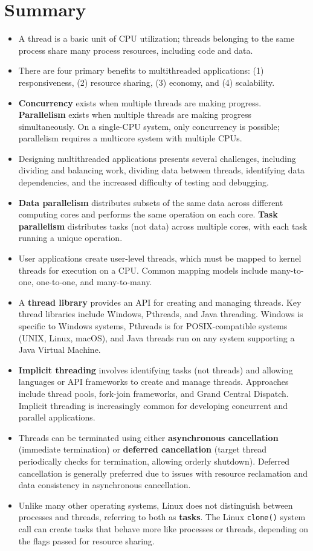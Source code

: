 \section{Summary}\label{sec:4.8}

\begin{itemize}
    \item A thread is a basic unit of CPU utilization; threads belonging to the same process share many process resources, including code and data.
    \item There are four primary benefits to multithreaded applications: (1) responsiveness, (2) resource sharing, (3) economy, and (4) scalability.
    \item \textbf{Concurrency} exists when multiple threads are making progress. \textbf{Parallelism} exists when multiple threads are making progress simultaneously. On a single-CPU system, only concurrency is possible; parallelism requires a multicore system with multiple CPUs.
    \item Designing multithreaded applications presents several challenges, including dividing and balancing work, dividing data between threads, identifying data dependencies, and the increased difficulty of testing and debugging.
    \item \textbf{Data parallelism} distributes subsets of the same data across different computing cores and performs the same operation on each core. \textbf{Task parallelism} distributes tasks (not data) across multiple cores, with each task running a unique operation.
    \item User applications create user-level threads, which must be mapped to kernel threads for execution on a CPU. Common mapping models include many-to-one, one-to-one, and many-to-many.
    \item A \textbf{thread library} provides an API for creating and managing threads. Key thread libraries include Windows, Pthreads, and Java threading. Windows is specific to Windows systems, Pthreads is for POSIX-compatible systems (UNIX, Linux, macOS), and Java threads run on any system supporting a Java Virtual Machine.
    \item \textbf{Implicit threading} involves identifying tasks (not threads) and allowing languages or API frameworks to create and manage threads. Approaches include thread pools, fork-join frameworks, and Grand Central Dispatch. Implicit threading is increasingly common for developing concurrent and parallel applications.
    \item Threads can be terminated using either \textbf{asynchronous cancellation} (immediate termination) or \textbf{deferred cancellation} (target thread periodically checks for termination, allowing orderly shutdown). Deferred cancellation is generally preferred due to issues with resource reclamation and data consistency in asynchronous cancellation.
    \item Unlike many other operating systems, Linux does not distinguish between processes and threads, referring to both as \textbf{tasks}. The Linux \texttt{clone()} system call can create tasks that behave more like processes or threads, depending on the flags passed for resource sharing.
\end{itemize}
